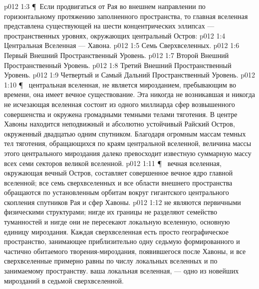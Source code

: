 \vs p012 1:3 \P\ Если продвигаться от Рая во внешнем направлении по горизонтальному протяжению заполненного пространства, то главная вселенная представлена существующей на шести концентрических эллипсах --- пространственных уровнях, окружающих центральный Остров:
\vs p012 1:4 \bibnobreakspace Центральная Вселенная --- Хавона.
\vs p012 1:5 \bibnobreakspace Семь Сверхвселенных.
\vs p012 1:6 \bibnobreakspace Первый Внешний Пространственный Уровень.
\vs p012 1:7 \bibnobreakspace Второй Внешний Пространственный Уровень.
\vs p012 1:8 \bibnobreakspace Третий Внешний Пространственный Уровень.
\vs p012 1:9 \bibnobreakspace Четвертый и Самый Дальний Пространственный Уровень.
\vs p012 1:10 \P\  центральная вселенная, не является мирозданием, пребывающим во времени, она имеет вечное существование. Эта никогда не возникавшая и никогда не исчезающая вселенная состоит из одного миллиарда сфер возвышенного совершенства и окружена громадными темными телами тяготения. В центре Хавоны находится неподвижный и абсолютно устойчивый Райский Остров, окруженный двадцатью одним спутником. Благодаря огромным массам темных тел тяготения, обращающихся по краям центральной вселенной, величина массы этого центрального мироздания далеко превосходит известную суммарную массу всех семи секторов великой вселенной.
\vs p012 1:11 \P\  вечная вселенная, окружающая вечный Остров, составляет совершенное вечное ядро главной вселенной; все семь сверхвселенных и все области внешнего пространства обращаются по установленным орбитам вокруг гигантского центрального скопления спутников Рая и сфер Хавоны.
\vs p012 1:12  не являются первичными физическими структурами; нигде их границы не разделяют семейство туманностей и нигде они не пересекают локальную вселенную, основную единицу мироздания. Каждая сверхвселенная есть просто географическое пространство, занимающее приблизительно одну седьмую формированного и частично обитаемого творения\hyp{}мироздания, появившегося после Хавоны, и все сверхвселенные примерно равны по числу локальных вселенных и по занимаемому пространству.  ваша локальная вселенная, --- одно из новейших мирозданий в  седьмой сверхвселенной.
